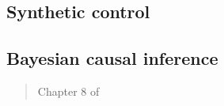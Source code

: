 \documentclass[12pt]{article}
\begin{document}
\begin{verse}  \end{verse}

\begin{verse}  \end{verse}

\subsection{Synthetic control}

\begin{verse}  \end{verse}

\begin{verse}  \end{verse}

\begin{verse}  \end{verse}

\subsection{Bayesian causal inference}

\begin{verse}  \end{verse}

\begin{verse} Chapter 8 of  \end{verse}

\begin{verse}  \end{verse}

\begin{verse}  \end{verse}

\begin{verse}  \end{verse}

\clearpage

\printbibliography[title=References]

%
\end{document}
